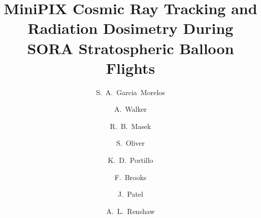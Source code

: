 \documentclass[final,1p, times, twocolumn]{elsarticle}
\begin{document}
\begin{frontmatter}


\title{MiniPIX Cosmic Ray Tracking and Radiation Dosimetry During SORA Stratospheric Balloon Flights}


\author{S.~A.~Garcia~Morelos}%
\author{A.~Walker}%
\author{R.~B.~Masek}
\author{S.~Oliver}
\author{K.~D.~Portillo}
\author{F.~Brooks}
\author{J.~Patel}
\author{A.~L.~Renshaw}



\address[label2,label3,label4,label5,label6,label7,label8,label9,label10,label11]{Department of Physics, University of Houston, Houston, TX 77204, USA}



\end{frontmatter}
\end{document}
